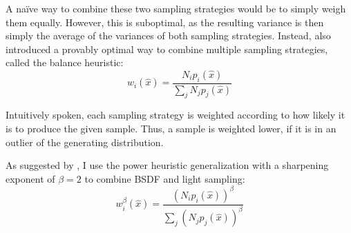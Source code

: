 A naïve way to combine these two sampling strategies would be to simply weigh them equally.
However, this is suboptimal, as the resulting variance is then simply the average of the variances of both sampling strategies.
Instead, \textcite{veach1997} also introduced a provably optimal way to combine multiple sampling strategies, called the balance heuristic:
\begin{equation}
    w_i(\hat{x}) = \frac{N_i p_i(\hat{x})}{\sum_{j} N_j p_j(\hat{x})}
\end{equation}

Intuitively spoken, each sampling strategy is weighted according to how likely it is to produce the given sample.
Thus, a sample is weighted lower, if it is in an outlier of the generating distribution.

As suggested by \textcite{veach1997}, I use the power heuristic generalization with a sharpening exponent of $\beta=2$ to combine BSDF and light sampling:
\begin{equation}
    w_i^{\beta}(\hat{x}) = \frac{(N_i p_i(\hat{x}))^\beta}{\sum_{j} (N_j p_j(\hat{x}))^{\beta}}
\end{equation}